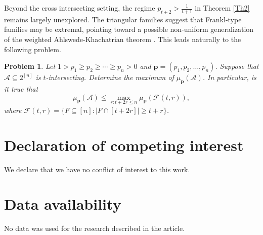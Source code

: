 \documentclass[11pt]{article}
\newtheorem{problem}[theorem]{Problem}
\begin{document}
Beyond the cross intersecting setting, the regime $p_{t+2}>\frac{1}{t+1}$ in  Theorem \ref{Th2}  remains largely unexplored. The triangular families suggest that Frankl-type families may be extremal, pointing toward a possible non-uniform generalization of the weighted Ahlswede-Khachatrian theorem \cite{ F17}.
This leads naturally to the  following problem.

 \begin{problem}\label{pb1}
Let $1 > p_1 \ge p_2 \ge \cdots \ge p_n > 0$ and $\textbf{p}=(p_1,p_2,\ldots,p_n)$. 
Suppose that $\mathcal{A} \subseteq 2^{[n]}$ is $t$-intersecting. Determine the maximum of $\mu_{\mathbf{p}}(\mathcal{A})$. In particular, is it true that
$$
\mu_{\mathbf{p}}(\mathcal{A}) \le \max_{r: t+2r\le n}\mu_{\mathbf{p}}(\mathcal{F}(t,r)),
$$ 
where $\mathcal{F}(t,r)=\{F\subseteq [n]: |F\cap[t+2r]|\geq t+r\}$.
\end{problem}




\section*{Declaration of competing interest}
We declare that we have no conflict of interest to this work.

\section*{Data availability}
No data was used for the research described in the article.



\end{document}
